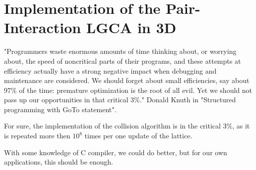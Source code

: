 \chapter{Implementation of the Pair-Interaction LGCA in 3D}

"Programmers waste enormous amounts of time thinking about, or worrying about, the speed of noncritical parts of their programs, and these attempts at efficiency actually have a strong negative impact when debugging and maintenance are considered. We should forget about small efficiencies, say about 97\% of the time: premature optimization is the root of all evil. Yet we should not pass up our opportunities in that critical 3\%." 
Donald Knuth in "Structured programming with GoTo statement".

For sure, the implementation of the collision algorithm is in the critical 3\%, as it is repeated more then $10^8$ times per one update of the lattice.

With some knowledge of C compiler, we could do better, but for our own applications, this should be enough.


